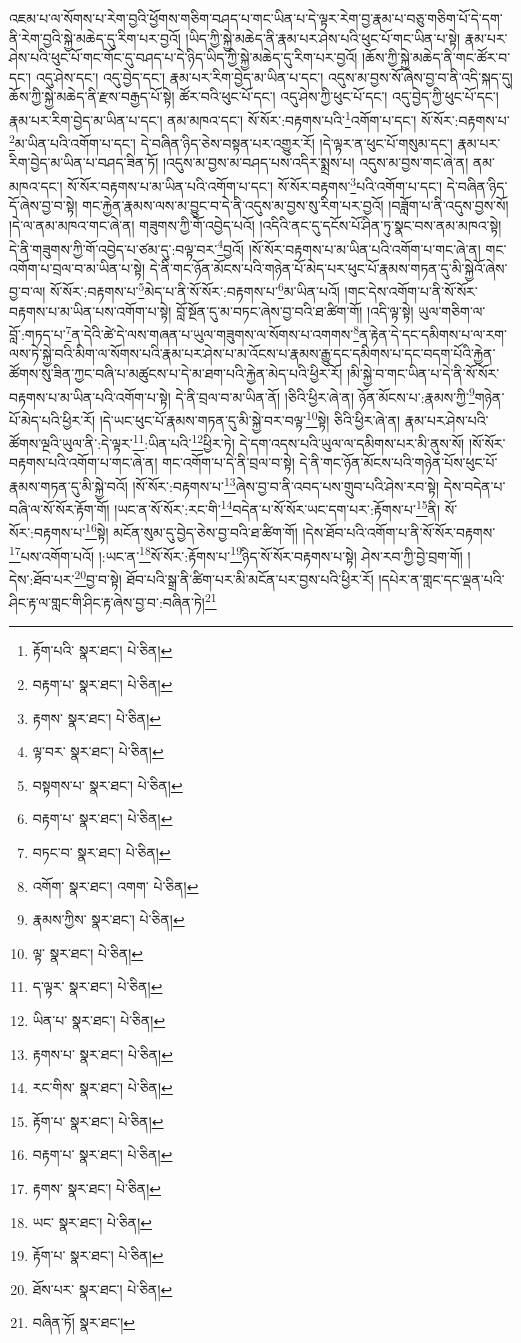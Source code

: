 འཇམ་པ་ལ་སོགས་པ་རེག་བྱའི་ཕྱོགས་གཅིག་བཤད་པ་གང་ཡིན་པ་དེ་ལྟར་རེག་བྱ་རྣམ་པ་བཅུ་གཅིག་པོ་དེ་དག་ནི་རེག་བྱའི་སྐྱེ་མཆེད་དུ་རིག་པར་བྱའོ། །ཡིད་ཀྱི་སྐྱེ་མཆེད་ནི་རྣམ་པར་ཤེས་པའི་ཕུང་པོ་གང་ཡིན་པ་སྟེ། རྣམ་པར་ཤེས་པའི་ཕུང་པོ་གང་གོང་དུ་བཤད་པ་དེ་ཉིད་ཡིད་ཀྱི་སྐྱེ་མཆེད་དུ་རིག་པར་བྱའོ། །ཆོས་ཀྱི་སྐྱེ་མཆེད་ནི་གང་ཚོར་བ་དང་། འདུ་ཤེས་དང་། འདུ་བྱེད་དང་། རྣམ་པར་རིག་བྱེད་མ་ཡིན་པ་དང་། འདུས་མ་བྱས་སོ་ཞེས་བྱ་བ་ནི་འདི་སྐད་དུ། ཆོས་ཀྱི་སྐྱེ་མཆེད་ནི་རྫས་བརྒྱད་པོ་སྟེ། ཚོར་བའི་ཕུང་པོ་དང་། འདུ་ཤེས་ཀྱི་ཕུང་པོ་དང་། འདུ་བྱེད་ཀྱི་ཕུང་པོ་དང་། རྣམ་པར་རིག་བྱེད་མ་ཡིན་པ་དང་། ནམ་མཁའ་དང་། སོ་སོར་:བརྟགས་པའི་\footnote{རྟོག་པའི་  སྣར་ཐང་།  པེ་ཅིན། }འགོག་པ་དང་། སོ་སོར་:བརྟགས་པ་\footnote{བརྟག་པ་  སྣར་ཐང་།  པེ་ཅིན། }མ་ཡིན་པའི་འགོག་པ་དང་། དེ་བཞིན་ཉིད་ཅེས་བསྟན་པར་འགྱུར་རོ། །དེ་ལྟར་ན་ཕུང་པོ་གསུམ་དང་། རྣམ་པར་རིག་བྱེད་མ་ཡིན་པ་བཤད་ཟིན་ཏོ། །འདུས་མ་བྱས་མ་བཤད་པས་འདིར་སྨྲས་པ། འདུས་མ་བྱས་གང་ཞེ་ན། ནམ་མཁའ་དང་། སོ་སོར་བརྟགས་པ་མ་ཡིན་པའི་འགོག་པ་དང་། སོ་སོར་བརྟགས་\footnote{རྟགས་  སྣར་ཐང་།  པེ་ཅིན། }པའི་འགོག་པ་དང་། དེ་བཞིན་ཉིད་དོ་ཞེས་བྱ་བ་སྟེ། གང་རྐྱེན་རྣམས་ལས་མ་བྱུང་བ་དེ་ནི་འདུས་མ་བྱས་སུ་རིག་པར་བྱའོ། །བཟློག་པ་ནི་འདུས་བྱས་སོ། །དེ་ལ་ནམ་མཁའ་གང་ཞེ་ན། གཟུགས་ཀྱི་གོ་འབྱེད་པའོ། །འདིའི་ནང་དུ་དངོས་པོ་ཤིན་ཏུ་སྣང་བས་ནམ་མཁའ་སྟེ། དེ་ནི་གཟུགས་ཀྱི་གོ་འབྱེད་པ་ཙམ་དུ་:བལྟ་བར་\footnote{ལྟ་བར་  སྣར་ཐང་།  པེ་ཅིན། }བྱའོ། །སོ་སོར་བརྟགས་པ་མ་ཡིན་པའི་འགོག་པ་གང་ཞེ་ན། གང་འགོག་པ་བྲལ་བ་མ་ཡིན་པ་སྟེ། དེ་ནི་གང་ཉོན་མོངས་པའི་གཉེན་པོ་མེད་པར་ཕུང་པོ་རྣམས་གཏན་དུ་མི་སྐྱེའོ་ཞེས་བྱ་བ་ལ། སོ་སོར་:བརྟགས་པ་\footnote{བསྟགས་པ་  སྣར་ཐང་།  པེ་ཅིན། }མེད་པ་ནི་སོ་སོར་:བརྟགས་པ་\footnote{བརྟག་པ་  སྣར་ཐང་།  པེ་ཅིན། }མ་ཡིན་པའོ། །གང་དེས་འགོག་པ་ནི་སོ་སོར་བརྟགས་པ་མ་ཡིན་པས་འགོག་པ་སྟེ། བློ་སྔོན་དུ་མ་བཏང་ཞེས་བྱ་བའི་ཐ་ཚིག་གོ། །འདི་ལྟ་སྟེ། ཡུལ་གཅིག་ལ་བློ་:གཏད་པ་\footnote{བཏང་བ་  སྣར་ཐང་།  པེ་ཅིན། }ན་དེའི་ཚེ་དེ་ལས་གཞན་པ་ཡུལ་གཟུགས་ལ་སོགས་པ་འགགས་\footnote{འགོག་  སྣར་ཐང་། འགག་  པེ་ཅིན། }ན་རྟེན་དེ་དང་དམིགས་པ་ལ་རག་ལས་ཏེ་སྐྱེ་བའི་མིག་ལ་སོགས་པའི་རྣམ་པར་ཤེས་པ་མ་འོངས་པ་རྣམས་རྒྱུ་དང་དམིགས་པ་དང་བདག་པོའི་རྐྱེན་ཚོགས་སུ་ཟིན་ཀྱང་བཞི་པ་མཚུངས་པ་དེ་མ་ཐག་པའི་རྐྱེན་མེད་པའི་ཕྱིར་རོ། །མི་སྐྱེ་བ་གང་ཡིན་པ་དེ་ནི་སོ་སོར་བརྟགས་པ་མ་ཡིན་པའི་འགོག་པ་སྟེ། དེ་ནི་བྲལ་བ་མ་ཡིན་ནོ། །ཅིའི་ཕྱིར་ཞེ་ན། ཉོན་མོངས་པ་:རྣམས་ཀྱི་\footnote{རྣམས་ཀྱིས་  སྣར་ཐང་།  པེ་ཅིན། }གཉེན་པོ་མེད་པའི་ཕྱིར་རོ། །དེ་ཡང་ཕུང་པོ་རྣམས་གཏན་དུ་མི་སྐྱེ་བར་བལྟ་\footnote{ལྟ་  སྣར་ཐང་།  པེ་ཅིན། }སྟེ། ཅིའི་ཕྱིར་ཞེ་ན། རྣམ་པར་ཤེས་པའི་ཚོགས་ལྔའི་ཡུལ་ནི་:དེ་ལྟར་\footnote{ད་ལྟར་  སྣར་ཐང་།  པེ་ཅིན། }:ཡིན་པའི་\footnote{ཡིན་པ་  སྣར་ཐང་།  པེ་ཅིན། }ཕྱིར་ཏེ། དེ་དག་འདས་པའི་ཡུལ་ལ་དམིགས་པར་མི་ནུས་སོ། །སོ་སོར་བརྟགས་པའི་འགོག་པ་གང་ཞེ་ན། གང་འགོག་པ་དེ་ནི་བྲལ་བ་སྟེ། དེ་ནི་གང་ཉོན་མོངས་པའི་གཉེན་པོས་ཕུང་པོ་རྣམས་གཏན་དུ་མི་སྐྱེ་བའོ། །སོ་སོར་:བརྟགས་པ་\footnote{རྟགས་པ་  སྣར་ཐང་།  པེ་ཅིན། }ཞེས་བྱ་བ་ནི་འབད་པས་གྲུབ་པའི་ཤེས་རབ་སྟེ། དེས་བདེན་པ་བཞི་ལ་སོ་སོར་རྟོག་གོ། །ཡང་ན་སོ་སོར་:རང་གི་\footnote{རང་གིས་  སྣར་ཐང་།  པེ་ཅིན། }བདེན་པ་སོ་སོར་ཡང་དག་པར་:རྟོགས་པ་\footnote{རྟོག་པ་  སྣར་ཐང་།  པེ་ཅིན། }ནི། སོ་སོར་:བརྟགས་པ་\footnote{བརྟག་པ་  སྣར་ཐང་།  པེ་ཅིན། }སྟེ། མངོན་སུམ་དུ་བྱེད་ཅེས་བྱ་བའི་ཐ་ཚིག་གོ། །དེས་ཐོབ་པའི་འགོག་པ་ནི་སོ་སོར་བརྟགས་\footnote{རྟགས་  སྣར་ཐང་།  པེ་ཅིན། }པས་འགོག་པའོ། །:ཡང་ན་\footnote{ཡང་  སྣར་ཐང་།  པེ་ཅིན། }སོ་སོར་:རྟོགས་པ་\footnote{རྟོག་པ་  སྣར་ཐང་།  པེ་ཅིན། }ཉིད་སོ་སོར་བརྟགས་པ་སྟེ། ཤེས་རབ་ཀྱི་བྱེ་བྲག་གོ། །དེས་:ཐོབ་པར་\footnote{ཐོས་པར་  སྣར་ཐང་།  པེ་ཅིན། }བྱ་བ་སྟེ། ཐོབ་པའི་སྒྲ་ནི་ཚིག་པར་མི་མངོན་པར་བྱས་པའི་ཕྱིར་རོ། །དཔེར་ན་གླང་དང་ལྡན་པའི་ཤིང་རྟ་ལ་གླང་གི་ཤིང་རྟ་ཞེས་བྱ་བ་:བཞིན་ཏེ།\footnote{བཞིན་ཏོ།  སྣར་ཐང་། } 